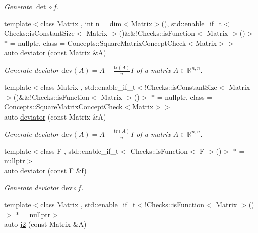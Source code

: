 \begin{DoxyCompactItemize}
\begin{DoxyCompactList}\small\item\em \-Generate $\det\circ f$. \end{DoxyCompactList}\item 
{\footnotesize template$<$class Matrix , int n = dim$<$\-Matrix$>$(), std\-::enable\-\_\-if\-\_\-t$<$ Checks\-::is\-Constant\-Size$<$ Matrix $>$()\&\&!\-Checks\-::is\-Function$<$ Matrix $>$()$>$ $\ast$  = nullptr, class  = \-Concepts\-::\-Square\-Matrix\-Concept\-Check$<$\-Matrix$>$$>$ }\\auto \hyperlink{group__LinearAlgebraGroup_ga7c0b1db93cfc5779a3b1e7eb1646c213}{deviator} (const \-Matrix \&\-A)
\begin{DoxyCompactList}\small\item\em \-Generate deviator $ \mathrm{dev}(A) = A - \frac{\mathrm{tr}(A)}{n}I $ of a matrix $ A\in\mathbb{R}^{n,n} $. \end{DoxyCompactList}\item 
{\footnotesize template$<$class Matrix , std\-::enable\-\_\-if\-\_\-t$<$!\-Checks\-::is\-Constant\-Size$<$ Matrix $>$()\&\&!\-Checks\-::is\-Function$<$ Matrix $>$()$>$ $\ast$  = nullptr, class  = \-Concepts\-::\-Square\-Matrix\-Concept\-Check$<$\-Matrix$>$$>$ }\\auto \hyperlink{group__LinearAlgebraGroup_gabc90de0d1754cd2e2d190ea8ba62245f}{deviator} (const \-Matrix \&\-A)
\begin{DoxyCompactList}\small\item\em \-Generate deviator $ \mathrm{dev}(A) = A - \frac{\mathrm{tr}(A)}{n}I $ of a matrix $ A\in\mathbb{R}^{n,n} $. \end{DoxyCompactList}\item 
{\footnotesize template$<$class F , std\-::enable\-\_\-if\-\_\-t$<$ Checks\-::is\-Function$<$ F $>$()$>$ $\ast$  = nullptr$>$ }\\auto \hyperlink{group__LinearAlgebraGroup_gad363f3add577abc046fc525ce83e22d3}{deviator} (const \-F \&f)
\begin{DoxyCompactList}\small\item\em \-Generate deviator $ \mathrm{dev}\circ f$. \end{DoxyCompactList}\item 
{\footnotesize template$<$class Matrix , std\-::enable\-\_\-if\-\_\-t$<$!\-Checks\-::is\-Function$<$ Matrix $>$()$>$ $\ast$  = nullptr$>$ }\\auto \hyperlink{group__InvariantGroup_ga9a2bc859fe1ae34b1a3ada91a39d69df}{j2} (const \-Matrix \&\-A)

\end{DoxyCompactItemize}
